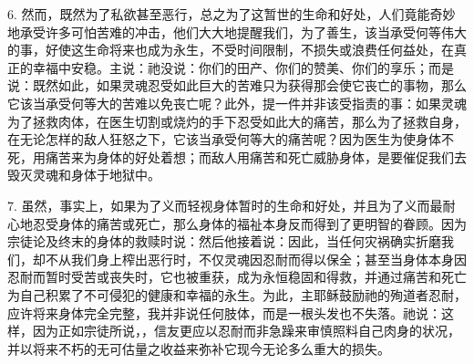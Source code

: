 6. 然而，既然为了私欲甚至恶行，总之为了这暂世的生命和好处，人们竟能奇妙地承受许多可怕苦难的冲击，他们大大地提醒我们，为了善生，该当承受何等伟大的事，好使这生命将来也成为永生，不受时间限制，不损失或浪费任何益处，在真正的幸福中安稳。主说：祂没说：你们的田产、你们的赞美、你们的享乐；而是说：既然如此，如果灵魂忍受如此巨大的苦难只为获得那会使它丧亡的事物，那么它该当承受何等大的苦难以免丧亡呢？此外，提一件并非该受指责的事：如果灵魂为了拯救肉体，在医生切割或烧灼的手下忍受如此大的痛苦，那么为了拯救自身，在无论怎样的敌人狂怒之下，它该当承受何等大的痛苦呢？因为医生为使身体不死，用痛苦来为身体的好处着想；而敌人用痛苦和死亡威胁身体，是要催促我们去毁灭灵魂和身体于地狱中。\par

7. 虽然，事实上，如果为了义而轻视身体暂时的生命和好处，并且为了义而最耐心地忍受身体的痛苦或死亡，那么身体的福祉本身反而得到了更明智的眷顾。因为宗徒论及终末的身体的救赎时说：然后他接着说：因此，当任何灾祸确实折磨我们，却不从我们身上榨出恶行时，不仅灵魂因忍耐而得以保全；甚至当身体本身因忍耐而暂时受苦或丧失时，它也被重获，成为永恒稳固和得救，并通过痛苦和死亡为自己积累了不可侵犯的健康和幸福的永生。为此，主耶稣鼓励祂的殉道者忍耐，应许将来身体完全完整，我并非说任何肢体，而是一根头发也不失落。祂说：这样，因为正如宗徒所说，，信友更应以忍耐而非急躁来审慎照料自己肉身的状况，并以将来不朽的无可估量之收益来弥补它现今无论多么重大的损失。\par

